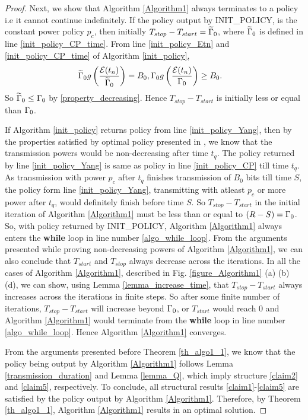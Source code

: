 \begin{proof}
Next, we show that Algorithm \ref{Algorithm1} always terminates to a policy i.e it cannot continue indefinitely. If the policy output by INIT\_POLICY, is the constant power policy $p_c$, then initially $T_{stop}-T_{start}=\widetilde{\Gamma}_0$, where $\widetilde{\Gamma}_0$ is defined in line \ref{init_policy_CP_time}. From line \ref{init_policy_Etn} and \ref{init_policy_CP_time} of Algorithm \ref{init_policy}, 
\begin{align}
& \widetilde{\Gamma}_0g\left(\dfrac{\mathcal{E}(t_n)}{\widetilde{\Gamma}_0}\right) = B_0, \Gamma_0g\left(\dfrac{\mathcal{E}(t_n)}{\Gamma_0}\right) \ge B_0.
\end{align}    
So $\widetilde{\Gamma}_0\le \Gamma_0$ by \eqref{property_decreasing}. Hence $T_{stop}-T_{start}$ is initially less or equal than $\Gamma_0$.

If Algorithm \ref{init_policy} returns policy from line \ref{init_policy_Yang}, then by the properties satisfied by optimal policy presented in \cite{Yang}, we know that the transmission powers would be non-decreasing after time $t_q$. The policy returned by line \ref{init_policy_Yang} is same as policy in line \ref{init_policy_CP} till time $t_q$. As transmission with power $p_c$ after $t_q$ finishes transmission of $B_0$ bits till time $S$, the policy form line \ref{init_policy_Yang}, transmitting with atleast $p_c$ or more power after $t_q$, would definitely finish before time $S$. So $T_{stop}-T_{start}$ in the initial iteration of Algorithm \ref{Algorithm1} must be less than or equal to $(R-S)=\Gamma_0$. So, with policy returned by INIT\_POLICY, Algorithm \ref{Algorithm1} always enters the \textbf{while} loop in line number \ref{algo_while_loop}. From the arguments presented while proving non-decreasing powers of Algorithm \ref{Algorithm1}, we can also conclude that $T_{start}$ and $T_{stop}$ always decrease across the iterations. In all the cases of Algorithm \ref{Algorithm1}, described in Fig. \ref{figure_Algorithm1} (a) (b) (d), we can show, using Lemma \ref{lemma_increase_time}, that $T_{stop}-T_{start}$ always increases across the iterations in finite steps. So after some finite number of iterations, $T_{stop}-T_{start}$ will increase beyond $\Gamma_0$, or $T_{start}$ would reach 0 and Algorithm \ref{Algorithm1} would terminate from the \textbf{while} loop in line number \ref{algo_while_loop}. Hence Algorithm \ref{Algorithm1} converges.
 
From the arguments presented before Theorem \ref{th_algo1_1}, we know that the policy being output by Algorithm \ref{Algorithm1} follows Lemma \ref{transmission_duration} and Lemma \ref{lemma_Q}, which imply structure \eqref{claim2} and \eqref{claim5}, respectively. To conclude, all structural results \eqref{claim1}-\eqref{claim5} are satisfied by the policy output by Algorithm \ref{Algorithm1}. Therefore,  by Theorem \ref{th_algo1_1}, Algorithm \ref{Algorithm1} results in an optimal solution.
\end{proof}